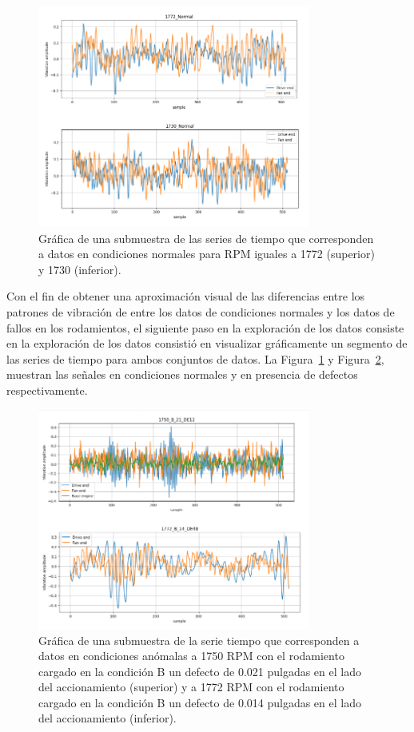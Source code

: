\documentclass[11pt,a4paper,spanish]{book}
\numberwithin{equation}{chapter}
\numberwithin{figure}{chapter}
\begin{document}
\begin{figure}[h]
    \centering
    \includegraphics[width=0.8\textwidth]{media/dataset/normal-series.png}
    \caption{Gráfica de una submuestra de las series de tiempo que corresponden a datos en condiciones normales para RPM iguales a 1772 (superior) y 1730 (inferior). }
    \label{fig:figNormalSeries}
\end{figure}


Con el fin de obtener una aproximación visual de las diferencias entre los patrones de vibración de entre los datos de condiciones normales y los datos de fallos en los rodamientos, el siguiente paso en la exploración de los datos consiste en la exploración de los datos consistió en visualizar gráficamente un segmento de las series de tiempo para ambos conjuntos de datos. La Figura~\ref{fig:figNormalSeries} y Figura~\ref{fig:figAnomalySeries}, muestran las señales en condiciones normales y en presencia de defectos respectivamente. 


\begin{figure}[h]
    \centering
    \includegraphics[width=0.8\textwidth]{media/dataset/anomaly-series.png}
    \caption{Gráfica de una submuestra de la serie tiempo que corresponden a datos en condiciones anómalas a 1750 RPM con el rodamiento cargado en la condición B un defecto de 0.021 pulgadas en el lado del accionamiento (superior) y a 1772 RPM con el rodamiento cargado en la condición B un defecto de 0.014 pulgadas en el lado del accionamiento (inferior). }
    \label{fig:figAnomalySeries}
\end{figure}
\end{document}
